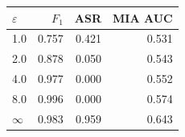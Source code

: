\begin{tabular}{lrrr}
\toprule
$\varepsilon$ & $F_1$ & ASR & MIA AUC \\
\midrule
1.0 & 0.757 & 0.421 & 0.531 \\
2.0 & 0.878 & 0.050 & 0.543 \\
4.0 & 0.977 & 0.000 & 0.552 \\
8.0 & 0.996 & 0.000 & 0.574 \\
$\infty$ & 0.983 & 0.959 & 0.643 \\
\bottomrule
\end{tabular}
